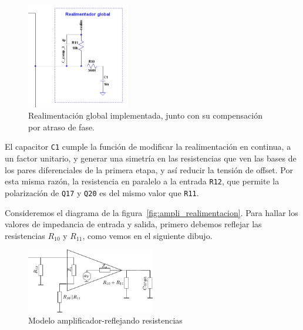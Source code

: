 \documentclass[a4paper,12pt,twoside]{article}
\begin{document}
\begin{figure}[H]
	\centering
	\includegraphics[width=0.4\textwidth]{img/realimentacion-global}
	\caption{Realimentación global implementada, junto con su compensación por atraso de fase.}
	\label{fig:realimentacion-global}
\end{figure}
 
 El capacitor \texttt{C1} cumple la función de modificar la realimentación en continua, a un factor unitario, y generar una simetría en las resistencias que ven las bases de los pares diferenciales de la primera etapa, y así reducir la tensión de offset. Por esta misma razón, la resistencia en paralelo a la entrada \texttt{R12}, que permite la polarización de \texttt{Q17} y \texttt{Q20} es del mismo valor que \texttt{R11}.
 

Consideremos el diagrama de la figura~\ref{fig:ampli_realimentacion}. Para hallar los valores de impedancia de entrada y salida, primero debemos reflejar las resistencias $R_{10}$ y $R_{11}$, como vemos en el siguiente dibujo.

\begin{figure}[H]
	\centering
	\includegraphics[width=0.5\textwidth]{img/reflejo}
	\caption{Modelo amplificador-reflejando resistencias}
	\label{fig:ampli_reflejo}
\end{figure}
\end{document}
